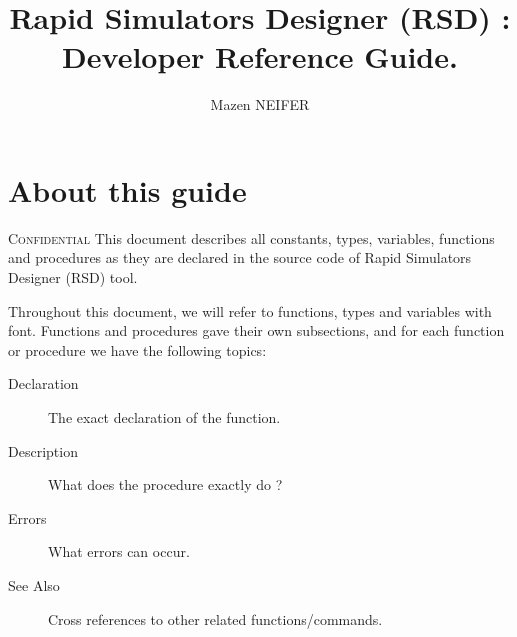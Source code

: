 \documentclass[10pt, a4paper]{book}
\begin{document}
\title{Rapid Simulators Designer (RSD) : \\ Developer Reference Guide.}
\date{}
\author{Mazen NEIFER}
\maketitle
\tableofcontents
\newpage

\cfoot{\thepage / \pageref{lastpage}}

\section*{About this guide}
\textsc{Confidential}
This document describes all constants, types, variables, functions and procedures as they are declared in the source code of Rapid Simulators Designer (RSD) tool.

Throughout this document, we will refer to functions, types and variables with  font. Functions and procedures gave their own subsections, and for each function or procedure we have the following topics:
\begin{description}
\item [Declaration] The exact declaration of the function.
\item [Description] What does the procedure exactly do ?
\item [Errors] What errors can occur.
\item [See Also] Cross references to other related functions/commands.
\end{description}


\end{document}
